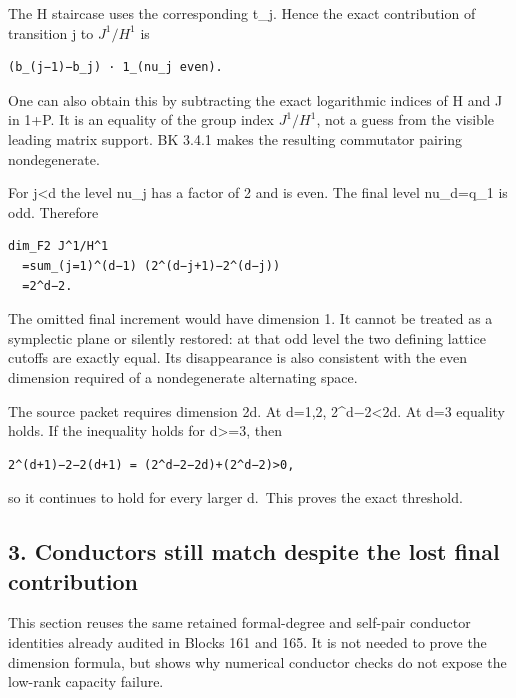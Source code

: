The H staircase uses the corresponding t\_j. Hence the exact
contribution of transition j to \(J^1/H^1\) is

\begin{Verbatim}[fontsize=\small,breaklines=true,breakanywhere=true]
(b_(j−1)−b_j) · 1_(nu_j even).
\end{Verbatim}

One can also obtain this by subtracting the exact logarithmic indices of
H and J in 1+P. It is an equality of the group index
\textbar \(J^1/H^1\)\textbar, not a guess from the visible
leading matrix support. BK 3.4.1 makes the resulting commutator pairing
nondegenerate.

For j\textless d the level nu\_j has a factor of 2 and is even. The final
level nu\_d=q\_1 is odd. Therefore

\begin{Verbatim}[fontsize=\small,breaklines=true,breakanywhere=true]
dim_F2 J^1/H^1
  =sum_(j=1)^(d−1) (2^(d−j+1)−2^(d−j))
  =2^d−2.
\end{Verbatim}

The omitted final increment would have dimension 1. It cannot be treated
as a symplectic plane or silently restored: at that odd level the two
defining lattice cutoffs are exactly equal. Its disappearance is also
consistent with the even dimension required of a nondegenerate
alternating space.

The source packet requires dimension 2d. At d=1,2, 2\^{}d−2\textless2d.
At d=3 equality holds. If the inequality holds for d\textgreater=3, then

\begin{Verbatim}[fontsize=\small,breaklines=true,breakanywhere=true]
2^(d+1)−2−2(d+1) = (2^d−2−2d)+(2^d−2)>0,
\end{Verbatim}

so it continues to hold for every larger d.~This proves the exact
threshold.

\hypertarget{dyadic_capacity-conductors-still-match-despite-the-lost-final-contribution}{%
\subsection{3. Conductors still match despite the lost final
contribution}\label{dyadic_capacity-conductors-still-match-despite-the-lost-final-contribution}}

This section reuses the same retained formal-degree and self-pair
conductor identities already audited in Blocks 161 and 165. It is not
needed to prove the dimension formula, but shows why numerical conductor
checks do not expose the low-rank capacity failure.

